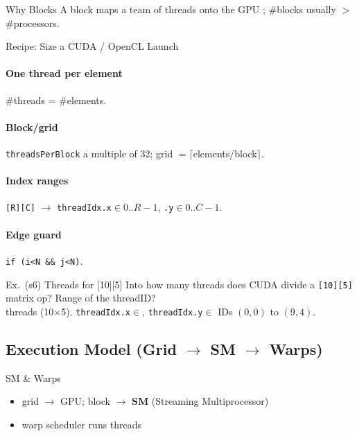 \begin{concept}{Why Blocks}
    A block maps a team of threads onto the GPU ; \#blocks usually $>$ \#processors.
\end{concept}

\multend

\begin{KR}{Recipe: Size a CUDA / OpenCL Launch}
    \paragraph{One thread per element} \#threads = \#elements.
    \paragraph{Block/grid} \texttt{threadsPerBlock} a multiple of 32; grid $=\lceil$elements/block$\rceil$.
    \paragraph{Index ranges} \texttt{[R][C]} $\to$ \texttt{threadIdx.x}$\in0..R{-}1$, \texttt{.y}$\in0..C{-}1$.
    \paragraph{Edge guard} \texttt{if (i<N \&\& j<N)}.
\end{KR}

\begin{example2}{Ex.\ (s6) Threads for [10][5]}
    Into how many threads does CUDA divide a \texttt{[10][5]} matrix op? Range of the threadID?
     \\ 
     threads (10$\times$5). \texttt{threadIdx.x}$\in$, \texttt{threadIdx.y}$\in$ IDs $(0,0)$ to $(9,4)$.
\end{example2}

\subsection{Execution Model (Grid $\to$ SM $\to$ Warps)}


\begin{definition}{SM \& Warps}
    \begin{itemize}
        \item grid $\to$ GPU; block $\to$ \textbf{SM} (Streaming Multiprocessor)
        \item warp scheduler runs  threads
    \end{itemize}
\end{definition}

